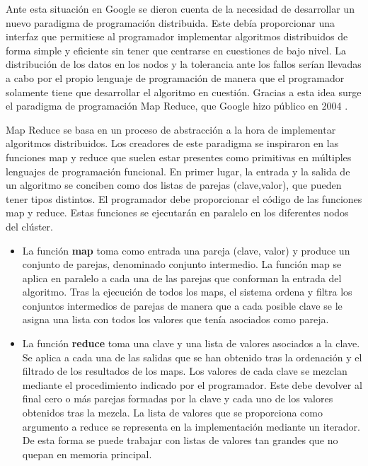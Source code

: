\documentclass[10pt]{article}
\begin{document}
		Ante esta situación en Google se dieron cuenta de la necesidad de desarrollar un nuevo paradigma de programación distribuida. Este debía proporcionar una interfaz que permitiese al programador implementar algoritmos distribuidos de forma simple y eficiente sin tener que centrarse en cuestiones de bajo nivel. La distribución de los datos en los nodos y la tolerancia ante los fallos serían llevadas a cabo por el propio lenguaje de programación de manera que el programador solamente tiene que desarrollar el algoritmo en cuestión. Gracias a esta idea surge el paradigma de programación Map Reduce, que Google hizo público en 2004 \cite{map-reduce1, map-reduce2, map-reduce3}.
	
		Map Reduce se basa en un proceso de abstracción a la hora de implementar algoritmos distribuidos. Los creadores de este paradigma se inspiraron en las funciones map y reduce que suelen estar presentes como primitivas en múltiples lenguajes de programación funcional. En primer lugar, la entrada y la salida de un algoritmo se conciben como dos listas de parejas (clave,valor), que pueden tener tipos distintos. El programador debe proporcionar el código de las funciones map y reduce. Estas funciones se ejecutarán en paralelo en los diferentes nodos del clúster.
		
		\begin{itemize}
			\item La función \textbf{map} toma como entrada una pareja (clave, valor) y produce un conjunto de parejas, denominado conjunto intermedio. La función map se aplica en paralelo a cada una de las parejas que conforman la entrada del algoritmo. Tras la ejecución de todos los maps, el sistema ordena y filtra los conjuntos intermedios de parejas de manera que a cada posible clave se le asigna una lista con todos los valores que tenía asociados como pareja.
			\item La función \textbf{reduce} toma una clave y una lista de valores asociados a la clave. Se aplica a cada una de las salidas que se han obtenido tras la ordenación y el filtrado de los resultados de los maps. Los valores de cada clave se mezclan mediante el procedimiento indicado por el programador. Este debe devolver al final cero o más parejas formadas por la clave y cada uno de los valores obtenidos tras la mezcla. La lista de valores que se proporciona como argumento a reduce se representa en la implementación mediante un iterador. De esta forma se puede trabajar con listas de valores tan grandes que no quepan en memoria principal.
		\end{itemize}  
		
\end{document}
